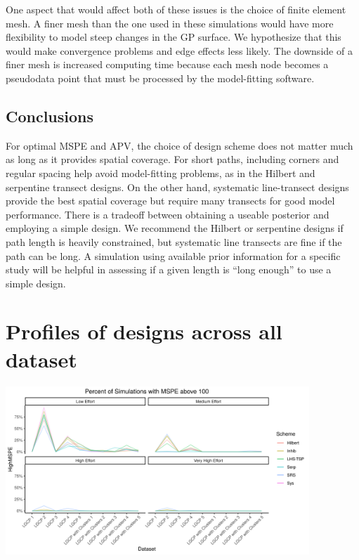 \documentclass[review]{elsarticle}
\begin{document}
One aspect that would affect both of these issues is the choice of finite
element mesh. A finer mesh than the one used in these simulations would have
more flexibility to model steep changes in the GP surface. We hypothesize that
this would make convergence problems and edge effects less likely. The downside
of a finer mesh is increased computing time because each mesh node becomes a
pseudodata point that must be processed by the model-fitting software.


\subsection{Conclusions}

For optimal MSPE and APV, the choice of design scheme does not matter much as
long as it provides spatial coverage. For short paths, including corners and
regular spacing help avoid model-fitting problems, as in the Hilbert and
serpentine transect designs. On the other hand, systematic line-transect
designs provide the best spatial coverage but require many transects for good
model performance. There is a tradeoff between obtaining a useable posterior
and employing a simple design. We recommend the Hilbert or serpentine designs
if path length is heavily constrained, but systematic line transects are fine
if the path can be long. A simulation using available prior information for a
specific study will be helpful in assessing if a given length is ``long
enough'' to use a simple design.


\appendix
\section{Profiles of designs across all dataset}

\includegraphics[width=4.5in]{../graphics/HighMSPE-profile.png}
\end{document}
